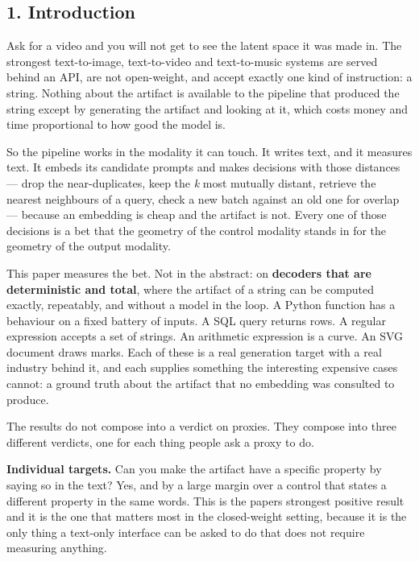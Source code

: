 \documentclass[
  10pt,
]{article}
\theoremstyle{plain}
\theoremstyle{definition}
\begin{document}
\subsection{1. Introduction}\label{1-introduction}

Ask for a video and you will not get to see the latent space it was made
in. The strongest text-to-image, text-to-video and text-to-music systems
are served behind an API, are not open-weight, and accept exactly one
kind of instruction: a string. Nothing about the artifact is available
to the pipeline that produced the string except by generating the
artifact and looking at it, which costs money and time proportional to
how good the model is.

So the pipeline works in the modality it can touch. It writes text, and
it measures text. It embeds its candidate prompts and makes decisions
with those distances --- drop the near-duplicates, keep the \emph{k}
most mutually distant, retrieve the nearest neighbours of a query, check
a new batch against an old one for overlap --- because an embedding is
cheap and the artifact is not. Every one of those decisions is a bet
that the geometry of the control modality stands in for the geometry of
the output modality.

This paper measures the bet. Not in the abstract: on \textbf{decoders
that are deterministic and total}, where the artifact of a string can be
computed exactly, repeatably, and without a model in the loop. A Python
function has a behaviour on a fixed battery of inputs. A SQL query
returns rows. A regular expression accepts a set of strings. An
arithmetic expression is a curve. An SVG document draws marks. Each of
these is a real generation target with a real industry behind it, and
each supplies something the interesting expensive cases cannot: a ground
truth about the artifact that no embedding was consulted to produce.

The results do not compose into a verdict on proxies. They compose into
three different verdicts, one for each thing people ask a proxy to do.

\textbf{Individual targets.} Can you make the artifact have a specific
property by saying so in the text? Yes, and by a large margin over a
control that states a different property in the same words. This is the
paper\textquotesingle s strongest positive result and it is the one that
matters most in the closed-weight setting, because it is the only thing
a text-only interface can be asked to do that does not require measuring
anything.
\end{document}
